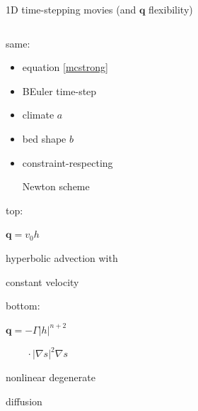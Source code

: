 \documentclass[xcolor={dvipsnames}]{beamer}
\newcommand\bq{\mathbf{q}}
\newcommand\grad{\nabla}
\begin{document}
\begin{frame}{1D time-stepping movies (and $\bq$ flexibility)}

\begin{columns}
\begin{column}{0.35\textwidth}
\alert{same:}

\begin{itemize}
\scriptsize
\item equation \eqref{mcstrong}
\item BEuler time-step
\item climate $a$
\item bed shape $b$
\item constraint-respecting

Newton scheme
\end{itemize}

\vspace{2mm}

\alert{top:}

\scriptsize

\medskip
$\bq = v_0 h$

hyperbolic advection with

constant velocity

\vspace{5mm}

\normalsize 

\alert{bottom:}

\scriptsize

\medskip
$\bq = - \Gamma |h|^{n+2}$

$\phantom{\bq = }\, \cdot |\grad s|^2 \grad s$

nonlinear degenerate

diffusion
\end{column}
\begin{column}{0.5\textwidth}
\hspace{-15mm}

\bigskip
\hspace{-15mm}

\end{column}
\end{columns}
\end{frame}
\end{document}
